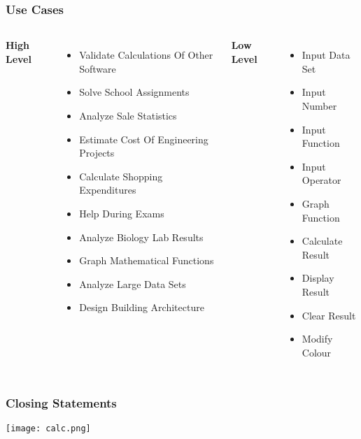 \documentclass{beamer}
\begin{document}
\begin{frame}
    \frametitle{Use Cases}
\begin{columns}
    \textbf{High Level}
    \begin{itemize}
        \item Validate Calculations Of Other Software
        \item Solve School Assignments
        \item Analyze Sale Statistics
        \item Estimate Cost Of Engineering Projects
        \item Calculate Shopping Expenditures
        \item Help During Exams
        \item Analyze Biology Lab Results
        \item Graph Mathematical Functions
        \item Analyze Large Data Sets
        \item Design Building Architecture
    \end{itemize} \pause
    \textbf{Low Level}
    \begin{itemize}
        \item Input Data Set
        \item Input Number
        \item Input Function
        \item Input Operator
        \item Graph Function
        \item Calculate Result
        \item Display Result
        \item Clear Result
        \item Modify Colour
    \end{itemize}
    \vspace{2cm}
\end{columns}
\end{frame}

\begin{frame}
    \begin{center}
    \frametitle{Closing Statements}
    \texttt{[image: calc.png]}
    \end{center}
\end{frame}
\end{document}
